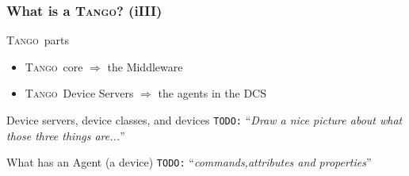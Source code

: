 \documentclass{beamer}
\newcommand{\tango}{\textsc{Tango}}
\newcommand{\todo}[1]{\texttt{\color{red}TODO:} ``\emph{#1}''}
\begin{document}
\begin{frame}
\frametitle{What is a \tango? (iIII)}
    \begin{block}{\tango\, parts}
        \begin{itemize}
            \item \tango\, core $\Rightarrow$ the Middleware
            \item \tango\, Device Servers $\Rightarrow$ the agents in the DCS
        \end{itemize}
    \end{block}
    \begin{exampleblock}{Device servers, device classes, and devices}
        \todo{Draw a nice picture about what those three things are...}
    \end{exampleblock}
    \begin{block}{What has an Agent (a device)}
        \todo{commands,attributes and properties}
    \end{block}
\end{frame}
\end{document}
